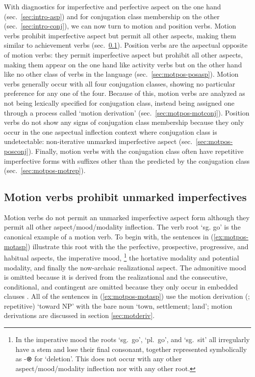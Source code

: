 \documentclass[12pt,letterpaper,oneside,article]{memoir}
\begin{document}
With diagnostics for imperfective and perfective aspect on the one hand (sec.\ \ref{sec:intro-asp}) and for conjugation class membership on the other (sec.\ \ref{sec:intro-conj}), we can now turn to motion and position verbs.
Motion verbs prohibit imperfective aspect but permit all other aspects, making them similar to achievement verbs (sec.\ \ref{sec:motpos-motasp}).
Position verbs are the aspectual opposite of motion verbs: they permit imperfective aspect but prohibit all other aspects, making them appear on the one hand like activity verbs but on the other hand like no other class of verbs in the language (sec.\ \ref{sec:motpos-posasp}).
Motion verbs generally occur with all four conjugation classes, showing no particular preference for any one of the four.
Because of this, motion verbs are analyzed as not being lexically specified for conjugation class, instead being assigned one through a process called ‘motion derivation’ (sec.\ \ref{sec:motpos-motconj}).
Position verbs do not show any signs of conjugation class membership because they only occur in the one aspectual inflection context where conjugation class is undetectable: non-iterative unmarked imperfective aspect (sec.\ \ref{sec:motpos-posconj}).
Finally, motion verbs with the  conjugation class often have repetitive imperfective forms with suffixes other than the  predicted by the conjugation class (sec.\ \ref{sec:motpos-motrep}).

\subsection{Motion verbs prohibit unmarked imperfectives}\label{sec:motpos-motasp}

Motion verbs do not permit an unmarked imperfective aspect form although they permit all other aspect/mood/modality inflection.
The verb root  ‘sg. go’ is the canonical example of a motion verb.
To begin with, the sentences in (\ref{ex:motpos-motasp}) illustrate this root with the the perfective, prospective, progressive, and habitual aspects,
the imperative mood,%
\footnote{In the imperative mood the roots  ‘sg.\ go’,  ‘pl.\ go’, and  ‘sg.\ sit’ all irregularly have a  stem and lose their final consonant, together represented symbolically as -⊗ for ‘deletion’.
This does not occur with any other aspect/mood/modality inflection nor with any other root.}
the hortative modality and potential modality, and finally the now-archaic realizational aspect.
The admonitive mood is omitted because it is derived from the realizational \parencite[659–660]{crippen:2019} and the consecutive, conditional, and contingent are omitted because they only occur in embedded clauses \parencites[443–452]{leer:1991}.
All of the sentences in (\ref{ex:motpos-motasp}) use the motion derivation  (;  repetitive) ‘toward NP’ with the bare noun  ‘town, settlement; land’; motion derivations are discussed in section \ref{sec:motderiv}.
\end{document}
